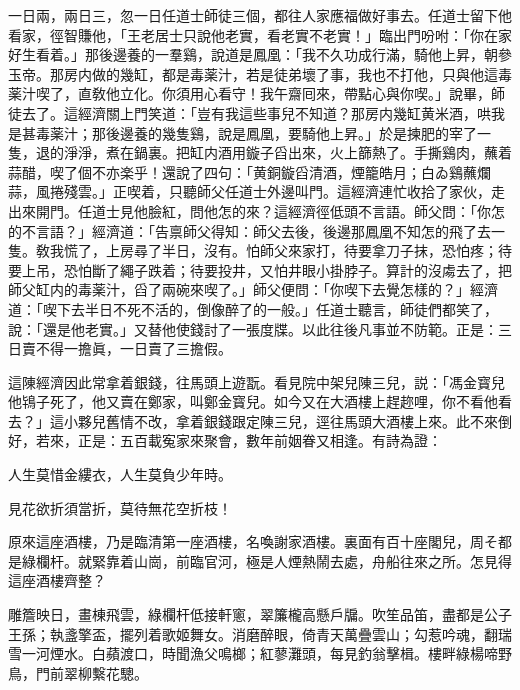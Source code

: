一日兩，兩日三，忽一日任道士師徒三個，都往人家應福做好事去。任道士留下他看家，徑智賺他，「王老居士只說他老實，看老實不老實！」臨出門吩咐：「你在家好生看着。」那後邊養的一羣鷄，說道是鳳凰：「我不久功成行滿，騎他上昇，朝參玉帝。那房内做的幾缸，都是毒薬汁，若是徒弟壞了事，我也不打他，只與他這毒薬汁喫了，直敎他立化。你須用心看守！我午齋囘來，帶點心與你喫。」說畢，師徒去了。這經濟關上門笑道：「豈有我這些事兒不知道？那房内幾缸黄米酒，哄我是甚毒薬汁；那後邊養的幾隻鷄，說是鳳凰，要騎他上昇。」於是揀肥的宰了一隻，退的淨淨，煮在鍋裏。把缸内酒用鏇子舀出來，火上篩熱了。手撕鷄肉，蘸着蒜醋，喫了個不亦楽乎！還說了四句：「黄銅鏇舀清酒，煙籠皓月；白ゐ鷄蘸爛蒜，風捲殘雲。」正喫着，只聽師父任道士外邊叫門。這經濟連忙收拾了家伙，走出來開門。任道士見他臉紅，問他怎的來？這經濟徑低頭不言語。師父問：「你怎的不言語？」經濟道：「告禀師父得知：師父去後，後邊那鳳凰不知怎的飛了去一隻。敎我慌了，上房尋了半日，沒有。怕師父來家打，待要拿刀子抹，恐怕疼；待要上吊，恐怕斷了繩子跌着；待要投井，又怕井眼小掛脖子。算計的沒䖏去了，把師父缸内的毒薬汁，舀了兩碗來喫了。」師父便問：「你喫下去覺怎樣的？」經濟道：「喫下去半日不死不活的，倒像醉了的一般。」任道士聽言，師徒們都笑了，說：「還是他老實。」又替他使錢討了一張度牒。以此往後凡事並不防範。正是：三日賣不得一擔眞，一日賣了三擔假。

這陳經濟因此常拿着銀錢，往馬頭上遊翫。看見院中架兒陳三兒，説：「馮金寳兒他鴇子死了，他又賣在鄭家，叫鄭金寳兒。如今又在大酒樓上趕趂哩，你不看他看去？」這小夥兒舊情不改，拿着銀錢跟定陳三兒，逕往馬頭大酒樓上來。此不來倒好，若來，正是：五百載寃家來聚會，數年前姻眷又相逢。有詩為證：

\begin{myquote}
人生莫惜金縷衣，人生莫負少年時。

見花欲折須當折，莫待無花空折枝！
\end{myquote}

原來這座酒樓，乃是臨清第一座酒樓，名喚謝家酒樓。裏面有百十座閣兒，周そ都是綠欄杆。就緊靠着山崗，前臨官河，極是人煙熱鬧去處，舟船往來之所。怎見得這座酒樓齊整？

\begin{myquote}
雕簷映日，畫棟飛雲，綠欄杆低接軒窻，翠簾櫳高懸戶牖。吹笙品笛，盡都是公子王孫；執盞擎盃，擺列着歌姬舞女。消磨醉眼，倚青天萬疊雲山；勾惹吟魂，翻瑞雪一河煙水。白蘋渡口，時聞漁父鳴榔；紅蓼灘頭，每見釣翁擊楫。樓畔綠楊啼野鳥，門前翠柳繫花驄。
\end{myquote}

